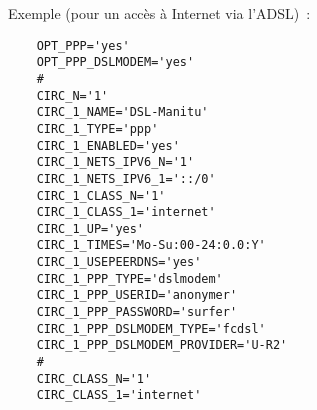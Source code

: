 Exemple (pour un accès à Internet via l'ADSL)~:

\begin{example}
\begin{verbatim}
    OPT_PPP='yes'
    OPT_PPP_DSLMODEM='yes'
    #
    CIRC_N='1'
    CIRC_1_NAME='DSL-Manitu'
    CIRC_1_TYPE='ppp'
    CIRC_1_ENABLED='yes'
    CIRC_1_NETS_IPV6_N='1'
    CIRC_1_NETS_IPV6_1='::/0'
    CIRC_1_CLASS_N='1'
    CIRC_1_CLASS_1='internet'
    CIRC_1_UP='yes'
    CIRC_1_TIMES='Mo-Su:00-24:0.0:Y'
    CIRC_1_USEPEERDNS='yes'
    CIRC_1_PPP_TYPE='dslmodem'
    CIRC_1_PPP_USERID='anonymer'
    CIRC_1_PPP_PASSWORD='surfer'
    CIRC_1_PPP_DSLMODEM_TYPE='fcdsl'
    CIRC_1_PPP_DSLMODEM_PROVIDER='U-R2'
    #
    CIRC_CLASS_N='1'
    CIRC_CLASS_1='internet'
\end{verbatim}
\end{example}
